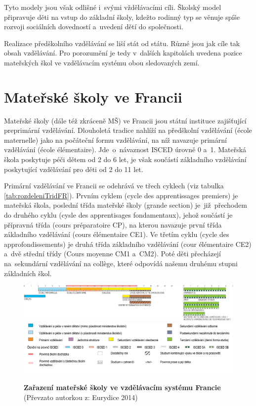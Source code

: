 		Tyto modely jsou však odlišné i~svými vždělávacími cíli. Školský model připravuje děti na vstup do základní školy, kdežto rodinný typ se věnuje spíše rozvoji sociálních dovedností a~uvedení dětí do společnosti.

		Realizace předškolního vzdělávání se liší stát od státu. Různé jsou jak cíle tak obsah vzdělávání. Pro porozumění je tedy v~dalších kapitolách uvedena pozice mateřských škol ve vzdělávacím systému obou sledovaných zemí. 
		

	\section{Mateřské školy ve Francii}
	\label{msvefr}

		Mateřské školy (dále též zkráceně MŠ) ve Francii jsou státní instituce zajišťující preprimární vzdělávání. 
		Dlouholetá tradice nahlíží na předškolní vzdělávání (école maternelle) jako na počáteční formu vzdělávání, na níž navazuje primární vzdělávání (école élémentaire). Jde o návaznost ISCED  úrovně 0 a~1. Mateřská škola poskytuje péči dětem od 2 do 6 let, je však součástí základního vzdělávání poskytující vzdělávání pro děti od 2 do 11 let.

		Primární vzdělávání ve Francii se odehrává ve třech cyklech (viz tabulka \ref{tab:rozdeleniTridFR}). Prvním cyklem (cycle des apprentissages premiers) je mateřská škola, poslední třída mateřské školy (grande section) je již přechodem do druhého cyklu (cysle des apprentisages fondamentaux), jehož součástí je přípravná třída (cours préparatoire CP), na kterou navazuje první třída základního vzdělávání (cours élémentaire CE1). Ve třetím cyklu (cycle des approfondissements) je druhá třída základního vzdělávání (cour élémentaire CE2) a~dvě střední třídy (Cours moyenne CM1 a~CM2). Poté děti přecházejí na sekundární vzdělávání na collège, které odpovídá našemu druhému stupni základních škol. 

		\begin{figure} [h!]
			\center
			\includegraphics[width=1.0\linewidth]{fotky/msFR.png} \\
			\includegraphics[width=1.0\linewidth]{fotky/msVysvetlivky.png}
			\caption{ \textbf{Zařazení mateřské školy ve vzdělávacím systému Francie}
			(Převzato autorkou z: Eurydice 2014)
			}
			\label{obr:msFR}
		\end{figure}


